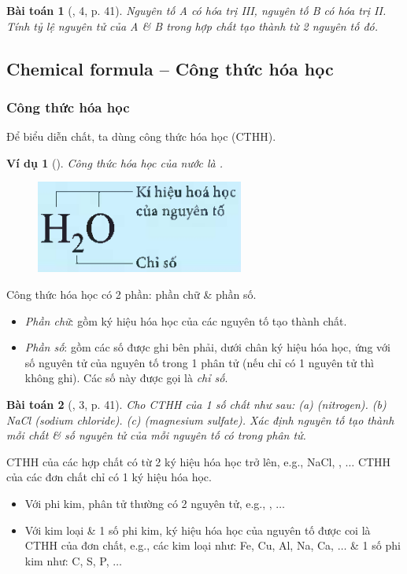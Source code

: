 \documentclass{article}
\newtheorem{baitoan}{Bài toán}
\newtheorem{vidu}{Ví dụ}
\begin{document}
\begin{baitoan}[\cite{SGK_KHTN_7_Canh_Dieu}, 4, p. 41]
	Nguyên tố A có hóa trị III, nguyên tố B có hóa trị II. Tính tỷ lệ nguyên tử của A \& B trong hợp chất tạo thành từ 2 nguyên tố đó.
\end{baitoan}

\subsection{Chemical formula -- Công thức hóa học}

\subsubsection{Công thức hóa học}
Để biểu diễn chất, ta dùng công thức hóa học (CTHH).

\begin{vidu}[]
	Công thức hóa học của nước là \emph{}.
	\begin{figure}[H]
		\centering
		\includegraphics[scale=0.3]{CTHH_H2O}
	\end{figure}
\end{vidu}
Công thức hóa học có 2 phần: phần chữ \& phần số.
\begin{itemize}
	\item \textit{Phần chữ}: gồm ký hiệu hóa học của các nguyên tố tạo thành chất.
	\item \textit{Phần số}: gồm các số được ghi bên phải, dưới chân ký hiệu hóa học, ứng với số nguyên tử của nguyên tố trong 1 phân tử (nếu chỉ có 1 nguyên tử thì không ghi). Các số này được gọi là \textit{chỉ số}.
\end{itemize}

\begin{baitoan}[\cite{SGK_KHTN_7_Canh_Dieu}, 3, p. 41]
	Cho CTHH của 1 số chất như sau: (a) \emph{} (nitrogen). (b) \emph{NaCl} (sodium chloride). (c) \emph{} (magnesium sulfate). Xác định nguyên tố tạo thành mỗi chất \& số nguyên tử của mỗi nguyên tố có trong phân tử.
\end{baitoan}
CTHH của các hợp chất có từ 2 ký hiệu hóa học trở lên, e.g., NaCl, , $\ldots$ CTHH của các đơn chất chỉ có 1 ký hiệu hóa học.
\begin{itemize}
	\item Với phi kim, phân tử thường có 2 nguyên tử, e.g., , $\ldots$
	\item Với kim loại \& 1 số phi kim, ký hiệu hóa học của nguyên tố được coi là CTHH của đơn chất, e.g., các kim loại như: Fe, Cu, Al, Na, Ca, $\ldots$ \& 1 số phi kim như: C, S, P, $\ldots$
\end{itemize}
\end{document}
